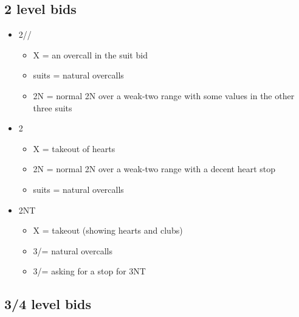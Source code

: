 \subsection{2 level bids}

\begin{itemize}
\item 2\clubs/\diamonds/\hearts
	\begin{itemize}
	\item X = an overcall in the suit bid
	\item suits = natural overcalls
	\item 2N = normal 2N over a weak-two range with some values in the other three suits
	\end{itemize}
\item 2\spades
	\begin{itemize}
	\item X = takeout of hearts
	\item 2N = normal 2N over a weak-two range with a decent heart stop
	\item suits = natural overcalls
	\end{itemize}
\item 2NT
	\begin{itemize}
	\item X = takeout (showing hearts and clubs)
	\item 3\clubs/\hearts = natural overcalls
	\item 3\diamonds/\spades = asking for a stop for 3NT
	\end{itemize}
\end{itemize}

\subsection{3/4 level bids}

